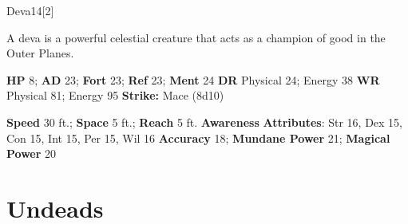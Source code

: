   \begin{monsection}{Deva}{14}[2]
    \vspace{-1em}\vspace{-1em}
    \vspace{0em}

    
      A deva is a powerful celestial creature that acts as a champion of good in the Outer Planes.
    

    \begin{spellcontent}
      \begin{spelltargetinginfo}
        \pari \textbf{HP} 8;
          \textbf{AD} 23;
          \textbf{Fort} 23;
          \textbf{Ref} 23;
          \textbf{Ment} 24
        \pari \textbf{DR} Physical 24; Energy 38
        \pari \textbf{WR} Physical 81; Energy 95
        \pari \textbf{Strike:}
            Mace  (8d10)
      \end{spelltargetinginfo}
    \end{spellcontent}
    \begin{monsterfooter}
      \pari \textbf{Speed} 30 ft.;
        \textbf{Space} 5 ft.;
        \textbf{Reach} 5 ft.
      \pari \textbf{Awareness} 
      \pari \textbf{Attributes}:
        Str 16, Dex 15,
        Con 15, Int 15,
        Per 15, Wil 16
      \pari \textbf{Accuracy} 18;
        \textbf{Mundane Power} 21;
      \textbf{Magical Power} 20
    \end{monsterfooter}
  \end{monsection}
  
  
        \section{Undeads}
      
